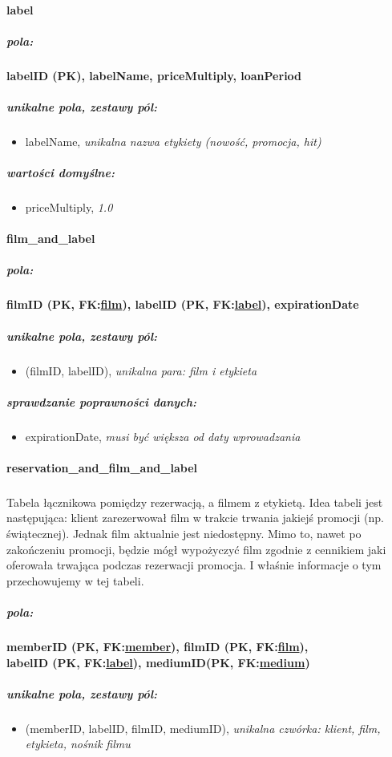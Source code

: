 \documentclass[12pt,a4paper,titlepage]{article}
\begin{document}
\paragraph{label}
\subparagraph{pola:}
\textbf{labelID (PK), labelName, priceMultiply, loanPeriod}
\subparagraph{unikalne pola, zestawy pól:}
\begin{itemize}
	\item labelName, \textit{unikalna nazwa etykiety (nowość, promocja, hit)}
\end{itemize}
\subparagraph{wartości domyślne:}
\begin{itemize}
	\item priceMultiply, \textit{1.0}
\end{itemize}

\paragraph{film\_and\_label}
\subparagraph{pola:}
\textbf{filmID (PK, FK:\underline{film}), labelID (PK, FK:\underline{label}), expirationDate}
\subparagraph{unikalne pola, zestawy pól:}
\begin{itemize}
	\item (filmID, labelID), \textit{unikalna para: film i etykieta}
\end{itemize}
\subparagraph{sprawdzanie poprawności danych:}
\begin{itemize}
	\item expirationDate, \textit{musi być większa od daty wprowadzania}
\end{itemize}

\newpage

\paragraph{reservation\_and\_film\_and\_label}
\subparagraph{}
Tabela łącznikowa pomiędzy rezerwacją, a filmem z etykietą. Idea tabeli jest następująca: klient zarezerwował film w trakcie trwania jakiejś promocji (np. świątecznej).
Jednak film aktualnie jest niedostępny. Mimo to, nawet po zakończeniu promocji, będzie mógł wypożyczyć film zgodnie z cennikiem jaki oferowała trwająca podczas rezerwacji promocja.
I właśnie informacje o tym przechowujemy w tej tabeli.
\subparagraph{pola:}
\textbf{memberID (PK, FK:\underline{member}), filmID (PK, FK:\underline{film}),} \\\textbf{labelID (PK, FK:\underline{label}), mediumID(PK, FK:\underline{medium})}
\subparagraph{unikalne pola, zestawy pól:}
\begin{itemize}
	\item (memberID, labelID, filmID, mediumID), \textit{unikalna czwórka: klient, film, etykieta, nośnik filmu}
\end{itemize}
\end{document}
